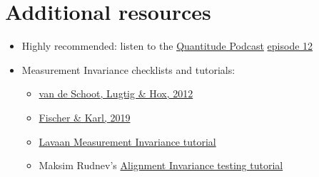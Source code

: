 \documentclass[
]{book}
\providecommand{\tightlist}{%
  \setlength{\itemsep}{0pt}\setlength{\parskip}{0pt}}
\begin{document}
\hypertarget{additional-resources}{%
\section{Additional resources}\label{additional-resources}}

\begin{itemize}
\item
  Highly recommended: listen to the \href{https://quantitudethepodcast.org/listen/}{Quantitude Podcast} \href{https://www.stitcher.com/podcast/quantitude/e/66905935}{episode 12}
\item
  Measurement Invariance checklists and tutorials:

  \begin{itemize}
  \tightlist
  \item
    \href{https://www.tandfonline.com/doi/abs/10.1080/17405629.2012.686740}{van de Schoot, Lugtig \& Hox, 2012}
  \item
    \href{https://www.frontiersin.org/articles/10.3389/fpsyg.2019.01507/full}{Fischer \& Karl, 2019}
  \item
    \href{https://lavaan.ugent.be/tutorial/groups.html}{Lavaan Measurement Invariance tutorial}
  \item
    Maksim Rudnev's \href{https://maksimrudnev.com/2019/05/01/alignment-tutorial/}{Alignment Invariance testing tutorial}
  \end{itemize}
\end{itemize}

  
\end{document}
